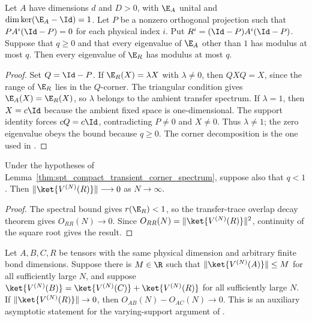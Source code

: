 \begin{lemma}
    \label{thm:spt_compact_transient_corner_spectrum}
    \leanok
    Let $A$ have dimensions $d$ and $D>0$, with $\E_A$ unital and
    $\dim\ker(\E_A-\Id)=1$. Let $P$ be a nonzero orthogonal projection
    such that $P A^i(\Id-P)=0$ for each physical index $i$.
    Put $R^i=(\Id-P)A^i(\Id-P)$. Suppose that $q\geq0$ and that
    every eigenvalue of $\E_A$ other than $1$ has modulus at most $q$.
    Then every eigenvalue of $\E_R$ has modulus at most $q$.
\end{lemma}
\begin{proof}\leanok
    Set $Q=\Id-P$. If $\E_R(X)=\lambda X$ with $\lambda\ne0$,
    then $QXQ=X$, since the range of $\E_R$ lies in the $Q$-corner.
    The triangular condition gives $\E_A(X)=\E_R(X)$, so $\lambda$
    belongs to the ambient transfer spectrum. If $\lambda=1$, then
    $X=c\Id$ because the ambient fixed space is one-dimensional.
    The support identity forces $cQ=c\Id$, contradicting $P\ne0$
    and $X\ne0$. Thus $\lambda\ne1$; the zero eigenvalue obeys the
    bound because $q\geq0$. The corner decomposition is the one used in
    \cite[proof of the TI canonical-form theorem]{PerezGarcia2007Matrix}.
\end{proof}

\begin{lemma}
    \label{thm:spt_compact_transient_mpv_decay}
    \leanok
    Under the hypotheses of
    Lemma~\ref{thm:spt_compact_transient_corner_spectrum}, suppose also
    that $q<1$. Then $\|\ket{V^{(N)}(R)}\|\longrightarrow0$ as
    $N\longrightarrow\infty$.
\end{lemma}
\begin{proof}\leanok
    The spectral bound gives $r(\E_R)<1$, so the transfer-trace overlap
    decay theorem gives $O_{RR}(N)\to0$. Since
    $O_{RR}(N)=\|\ket{V^{(N)}(R)}\|^2$, continuity of the square root
    gives the result.
\end{proof}

\begin{lemma}
    \label{thm:spc_aux_overlap_remainder_zero}
    \leanok
    Let $A,B,C,R$ be tensors with the same physical dimension and arbitrary
    finite bond dimensions. Suppose there is $M\in\R$ such that
    $\|\ket{V^{(N)}(A)}\|\leq M$ for all sufficiently large $N$, and suppose
    $\ket{V^{(N)}(B)}=\ket{V^{(N)}(C)}+\ket{V^{(N)}(R)}$ for all sufficiently large $N$.
    If $\|\ket{V^{(N)}(R)}\|\to0$, then
    $O_{AB}(N)-O_{AC}(N)\to0$.
    This is an auxiliary asymptotic statement for the varying-support
    argument of \cite[Appendix~C, lines~2653--2717]{Schuch2011Phases}.
\end{lemma}

